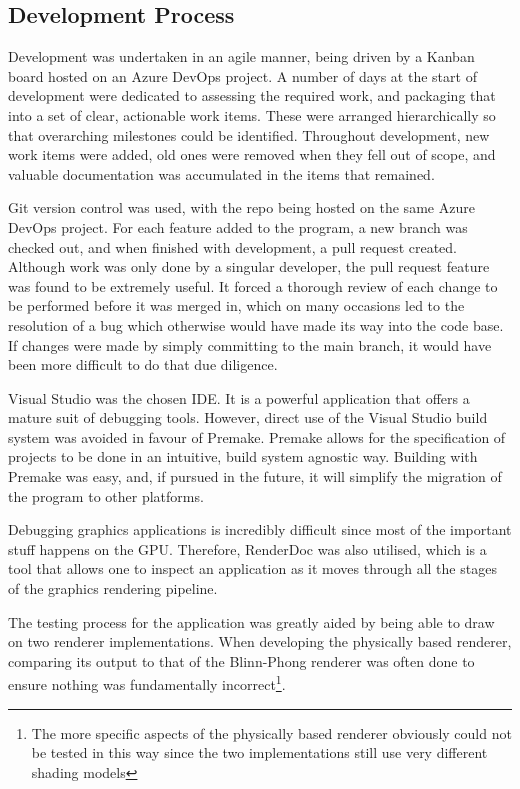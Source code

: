 \subsection{Development Process}

Development was undertaken in an agile manner, being driven by a Kanban board hosted on an Azure DevOps project. A number of days at the start of development were dedicated to assessing the required work, and packaging that into a set of clear, actionable work items. These were arranged hierarchically so that overarching milestones could be identified. Throughout development, new work items were added, old ones were removed when they fell out of scope, and valuable documentation was accumulated in the items that remained.

Git version control was used, with the repo being hosted on the same Azure DevOps project. For each feature added to the program, a new branch was checked out, and when finished with development, a pull request created. Although work was only done by a singular developer, the pull request feature was found to be extremely useful. It forced a thorough review of each change to be performed before it was merged in, which on many occasions led to the resolution of a bug which otherwise would have made its way into the code base. If changes were made by simply committing to the main branch, it would have been more difficult to do that due diligence.

Visual Studio was the chosen IDE. It is a powerful application that offers a mature suit of debugging tools. However, direct use of the Visual Studio build system was avoided in favour of Premake. Premake allows for the specification of projects to be done in an intuitive, build system agnostic way. Building with Premake was easy, and, if pursued in the future, it will simplify the migration of the program to other platforms.

Debugging graphics applications is incredibly difficult since most of the important stuff happens on the GPU. Therefore, RenderDoc was also utilised, which is a tool that allows one to inspect an application as it moves through all the stages of the graphics rendering pipeline.

The testing process for the application was greatly aided by being able to draw on two renderer implementations. When developing the physically based renderer, comparing its output to that of the Blinn-Phong renderer was often done to ensure nothing was fundamentally incorrect\footnote{The more specific aspects of the physically based renderer obviously could not be tested in this way since the two implementations still use very different shading models}.

